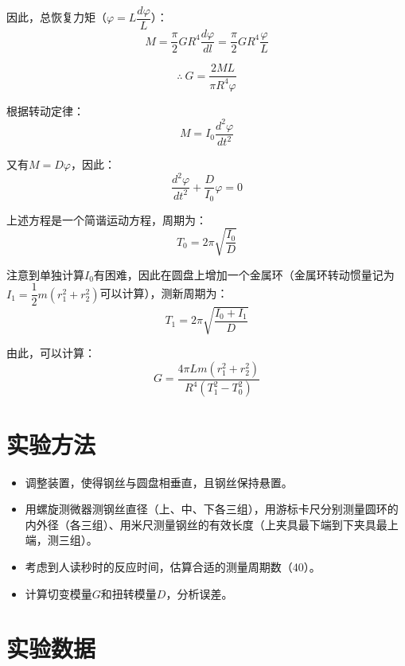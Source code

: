 \documentclass[a4paper]{ltxdoc}
\begin{document}
\begin{multicols}{2}
  因此，总恢复力矩（$\varphi = L \dfrac{d\varphi}{L}$）：
  \begin{equation}
    M = \dfrac{\pi}{2} G R ^4 \dfrac{d\varphi}{dl} = \dfrac{\pi}{2} G R ^4 \dfrac{\varphi} {L}
  \end{equation}

  \begin{equation}
    \therefore\ G = \dfrac{2ML}{\pi R^4 \varphi}
  \end{equation}

  根据转动定律：
  \begin{equation}
    M = I_0 \dfrac{d^2\varphi}{dt^2}
  \end{equation}

  又有$M = D\varphi$，因此：
  \begin{equation}
    \dfrac{d^2\varphi}{dt^2} + \dfrac{D}{I_0}\varphi = 0
  \end{equation}

  上述方程是一个简谐运动方程，周期为：
  \begin{equation}
    T_0 = 2\pi \sqrt{\dfrac{I_0}{D}}
  \end{equation}

  注意到单独计算$I_0$有困难，因此在圆盘上增加一个金属环（金属环转动惯量记为$I_1=\dfrac 1 2 m (r_1^2+r_2^2)$可以计算），测新周期为：
  \begin{equation}
    T_1 = 2\pi \sqrt{\dfrac{I_0+I_1}{D}}
  \end{equation}

  由此，可以计算：
  \begin{equation}
    G = \dfrac{4\pi Lm(r_1^2+r_2^2)}{R^4(T_1^2-T_0^2)}
  \end{equation}
  \section{实验方法}
  \begin{itemize}
    \item 调整装置，使得钢丝与圆盘相垂直，且钢丝保持悬置。
    \item 用螺旋测微器测钢丝直径（上、中、下各三组），用游标卡尺分别测量圆环的内外径（各三组）、用米尺测量钢丝的有效长度（上夹具最下端到下夹具最上端，测三组）。
    \item 考虑到人读秒时的反应时间，估算合适的测量周期数（40）。
    \item 计算切变模量$G$和扭转模量$D$，分析误差。
  \end{itemize}
  \section{实验数据}


\end{multicols}
\end{document}
